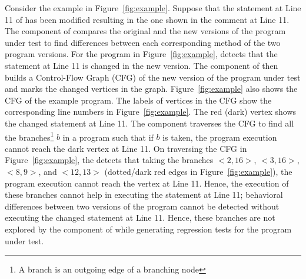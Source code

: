 	Consider the example in Figure~\ref{fig:example}. Suppose that the statement at Line 11 of  has been modified resulting in the one shown in the comment at Line 11.
	The  component of  compares the original and the new versions of the program under test to find differences between each corresponding method of the two program versions. For the program in Figure~\ref{fig:example},  detects that the statement at Line 11 is changed in the new version. The  component of  then builds a Control-Flow Graph (CFG) of the new version of  the program under test and marks the changed vertices in the graph. Figure~\ref{fig:example} also shows the CFG of the example program. The labels of vertices in the CFG show the corresponding line numbers in Figure~\ref{fig:example}. The red (dark) vertex shows the changed statement at Line 11. The  component traverses the CFG to find all the branches\footnote{\scriptsize{A branch is an outgoing edge of a branching node}} $b$ in a program such that if $b$ is taken, the program execution cannot reach the dark vertex at Line 11. 
	On traversing the CFG in Figure~\ref{fig:example}, the  detects that taking the branches $<2, 16>$, $<3, 16>$, $<8, 9>$, and $<12, 13>$ (dotted/dark red edges in Figure~\ref{fig:example}), the program execution cannot reach the vertex at Line 11. Hence, the execution of these branches cannot help in executing the statement at Line 11; behavioral differences between two versions of the program cannot be detected without executing the changed statement at Line 11. Hence, these branches are not explored by the  component of  while generating regression tests for the program under test. 
